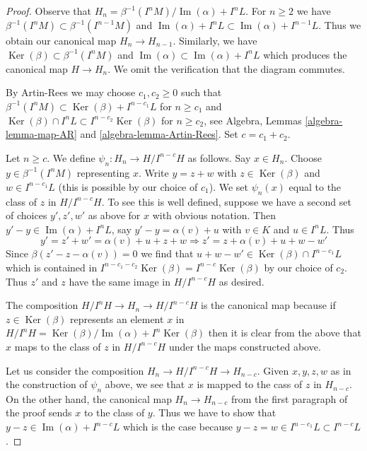 \documentclass[10pt,a4paper]{amsart}
\theoremstyle{plain}
\theoremstyle{definition}
\theoremstyle{remark}
\numberwithin{equation}{subsection}
\def\Ker{\mathop{\mathrm{Ker}}}
\def\Im{\mathop{\mathrm{Im}}}
\begin{document}
\begin{proof}
Observe that $H_n = \beta^{-1}(I^nM)/\Im(\alpha) + I^nL$. For $n \geq 2$
we have $\beta^{-1}(I^nM) \subset \beta^{-1}(I^{n - 1}M)$ and
$\Im(\alpha) + I^nL \subset \Im(\alpha) + I^{n - 1}L$. Thus
we obtain our canonical map $H_n \to H_{n - 1}$. Similarly, we have
$\Ker(\beta) \subset \beta^{-1}(I^nM)$ and
$\Im(\alpha) \subset \Im(\alpha) + I^nL$ which produces the
canonical map $H \to H_n$. We omit the verification that the diagram
commutes.

\medskip\noindent
By Artin-Rees we may choose $c_1, c_2 \geq 0$ such that
$\beta^{-1}(I^nM) \subset \Ker(\beta) + I^{n - c_1}L$ for $n \geq c_1$ and
$\Ker(\beta) \cap I^nL \subset I^{n - c_2}\Ker(\beta)$ for $n \geq c_2$, see
Algebra, Lemmas \ref{algebra-lemma-map-AR} and
\ref{algebra-lemma-Artin-Rees}. Set $c = c_1 + c_2$.

\medskip\noindent
Let $n \geq c$. We define $\psi_n : H_n \to H/I^{n - c}H$ as follows.
Say $x \in H_n$. Choose $y \in \beta^{-1}(I^nM)$ representing $x$.
Write $y = z + w$ with $z \in \Ker(\beta)$ and $w \in I^{n - c_1}L$
(this is possible by our choice of $c_1$). We set $\psi_n(x)$
equal to the class of $z$ in $H/I^{n - c}H$. To see this is well defined,
suppose we have a second set of choices $y', z', w'$ as above for $x$
with obvious notation.
Then $y' - y \in \Im(\alpha) + I^nL$, say $y' - y = \alpha(v) + u$
with $v \in K$ and $u \in I^nL$. Thus
$$
y' = z' + w' = \alpha(v) + u + z + w
\Rightarrow
z' = z + \alpha(v) + u + w - w'
$$
Since $\beta(z' - z - \alpha(v)) = 0$ we find that
$u + w - w' \in \Ker(\beta) \cap I^{n - c_1}L$
which is contained in $I^{n - c_1 - c_2}\Ker(\beta) = I^{n - c}\Ker(\beta)$
by our choice of $c_2$. Thus $z'$ and $z$ have the same image in
$H/I^{n - c}H$ as desired.

\medskip\noindent
The composition $H/I^n H \to H_n \to  H/I^{n - c}H$ is the canonical map
because if $z \in \Ker(\beta)$ represents an element $x$ in
$H/I^nH = \Ker(\beta)/\Im(\alpha) + I^n\Ker(\beta)$ then it is clear
from the above that $x$ maps to the class of $z$ in $H/I^{n - c}H$
under the maps constructed above.

\medskip\noindent
Let us consider the composition $H_n \to H/I^{n - c}H \to H_{n - c}$.
Given $x, y, z, w$ as in the construction of $\psi_n$ above, we see
that $x$ is mapped to the cass of $z$ in $H_{n - c}$. On the other hand,
the canonical map $H_n \to H_{n - c}$ from the first paragraph of the
proof sends $x$ to the class of $y$. Thus we have to show that
$y - z \in \Im(\alpha) + I^{n - c}L$ which is the case because
$y - z = w \in I^{n - c_1}L \subset I^{n - c}L$.


\end{proof}
\end{document}
